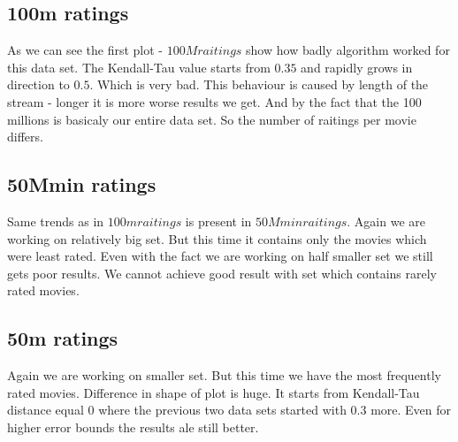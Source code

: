 \pgfplotsset{scaled x ticks=false}
\begin{center}
\end{center}

\subsection{100m ratings}		
As we can see the first plot - $100M raitings$ show how badly algorithm worked for this data set.
The Kendall-Tau value starts from $0.35$ and rapidly grows in direction to $0.5$. Which is very bad.
This behaviour is caused by length of the stream - longer it is more worse results we get. And by the fact
that the 100 millions is basicaly our entire data set. So the number of raitings per movie differs.

\subsection{50Mmin ratings}	
Same trends as in $100m raitings$ is present in $50Mmin raitings$. Again we are working on relatively big set. But this time it contains
only the movies which were least rated. Even with the fact we are working on half smaller set we still gets poor results. We cannot 
achieve good result with set which contains rarely rated movies.

\subsection{50m ratings}
Again we are working on smaller set. But this time we have the most frequently rated movies. Difference in shape of plot is huge.
It starts from Kendall-Tau distance equal $0$ where the previous two data sets started with 0.3 more. Even for higher error bounds 
the results ale still better. 

